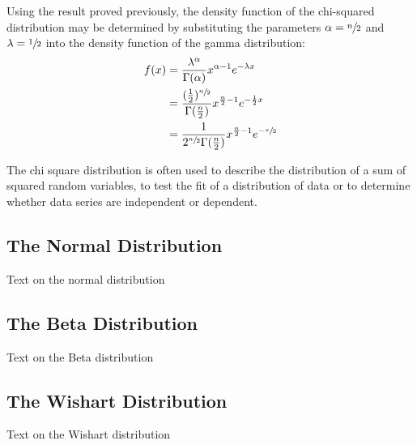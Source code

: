 \documentclass[12pt]{article}
\begin{document}
Using the result proved previously, the density function of the chi-squared distribution may be determined by
substituting the parameters $\alpha = \sfrac{n}{2}$ and $\lambda = \sfrac{1}{2}$ into the density function of the gamma
distribution:
\begin{equation*}\label{eq:chisquared-density}
	\begin{split}
		f(x)	&=	\frac{\lambda^\alpha}{\Gamma(\alpha)}x^{\alpha-1}e^{-\lambda x}\\
				&=	\frac{(\frac{1}{2})^{\sfrac{n}{2}}}{\Gamma(\frac{n}{2})}x^{\frac{n}{2}-1}e^{-\frac{1}{2}x}\\
				&=	\frac{1}{2^{\sfrac{n}{2}}\Gamma(\frac{n}{2})}x^{\frac{n}{2}-1}e^{-\sfrac{x}{2}}
	\end{split}
\end{equation*}


The chi square distribution is often used to describe the distribution of a sum of squared random variables, to test the
fit of a distribution of data or to determine whether data series are independent or dependent.

\subsection{The Normal Distribution}
Text on the normal distribution


\pagebreak
\subsection{The Beta Distribution}
Text on the Beta distribution


\pagebreak
\subsection{The Wishart Distribution}
Text on the Wishart distribution
\end{document}
